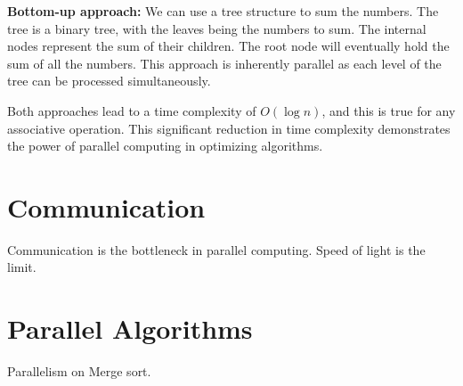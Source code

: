 \documentclass[a4paper]{tufte-handout} %
\begin{document}
\textbf{Bottom-up approach:} We can use a tree structure to sum the numbers. The tree is a binary tree, with the leaves being the numbers to sum. The internal nodes represent the sum of their children. The root node will eventually hold the sum of all the numbers. This approach is inherently parallel as each level of the tree can be processed simultaneously.

Both approaches lead to a time complexity of $O(\log n)$, and this is true for any associative operation. This significant reduction in time complexity demonstrates the power of parallel computing in optimizing algorithms.

\section{Communication}

Communication is the bottleneck in parallel computing. Speed of light is the limit. 

\section{Parallel Algorithms}

Parallelism on Merge sort.

\newpage

 

\end{document}

